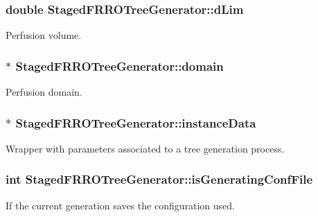 \subsubsection[{\texorpdfstring{d\+Lim}{dLim}}]{\setlength{\rightskip}{0pt plus 5cm}double Staged\+F\+R\+R\+O\+Tree\+Generator\+::d\+Lim\hspace{0.3cm}{\ttfamily [private]}}\hypertarget{class_staged_f_r_r_o_tree_generator_a7f36129068076eb3a54f051aa12cda40}{}\label{class_staged_f_r_r_o_tree_generator_a7f36129068076eb3a54f051aa12cda40}
Perfusion volume. 
\subsubsection[{\texorpdfstring{domain}{domain}}]{$\ast$ Staged\+F\+R\+R\+O\+Tree\+Generator\+::domain\hspace{0.3cm}{\ttfamily [private]}}\hypertarget{class_staged_f_r_r_o_tree_generator_a2f8616a24551a7a414b51b805309894a}{}\label{class_staged_f_r_r_o_tree_generator_a2f8616a24551a7a414b51b805309894a}
Perfusion domain. 
\subsubsection[{\texorpdfstring{instance\+Data}{instanceData}}]{$\ast$ Staged\+F\+R\+R\+O\+Tree\+Generator\+::instance\+Data\hspace{0.3cm}{\ttfamily [private]}}\hypertarget{class_staged_f_r_r_o_tree_generator_aa5d549a1ae7bfce749e418301ba92a2f}{}\label{class_staged_f_r_r_o_tree_generator_aa5d549a1ae7bfce749e418301ba92a2f}
Wrapper with parameters associated to a tree generation process. 
\subsubsection[{\texorpdfstring{is\+Generating\+Conf\+File}{isGeneratingConfFile}}]{\setlength{\rightskip}{0pt plus 5cm}int Staged\+F\+R\+R\+O\+Tree\+Generator\+::is\+Generating\+Conf\+File\hspace{0.3cm}{\ttfamily [private]}}\hypertarget{class_staged_f_r_r_o_tree_generator_a0b79edc4a184c376ab11260603004932}{}\label{class_staged_f_r_r_o_tree_generator_a0b79edc4a184c376ab11260603004932}
If the current generation saves the configuration used. 
